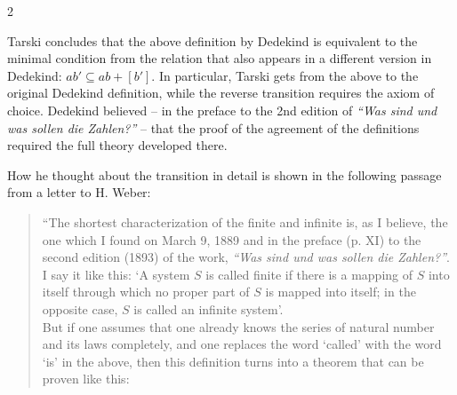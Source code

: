 \documentclass[leqno,hidelinks,10pt]{article}
\theoremstyle{definition}
\newcommand{\partof}{\subseteq}
\begin{document}
\begin{paracol}{2}
\begin{rightcolumn}
Tarski concludes that the above definition by Dedekind is equivalent to the
minimal condition from the relation that also appears in a different version in
Dedekind: $ab' \partof ab+[b']$. In particular, Tarski gets from the above to
the original Dedekind definition, while the reverse transition requires the axiom
of choice. Dedekind believed -- in the preface to the 2nd edition of
\emph{``Was sind und was sollen die Zahlen?''} -- that the proof of the agreement
of the definitions required the full theory developed there.
\


How he thought about the transition in detail is shown in the following passage
from a letter to H. Weber:

\begin{quote}
``The shortest characterization of the finite and infinite is, as I believe, the
one which I found on March 9, 1889 and in the preface (p. XI) to the second edition
(1893) of the work, \emph{``Was sind und was sollen die Zahlen?''}. I say it like
this: `A system $S$ is called finite if there is a mapping of $S$ into itself
through which no proper part of $S$ is mapped into itself; in the opposite case,
$S$ is called an infinite system'.
\ \\




\hspace{12pt} But if one assumes that one already knows the series of natural
number and its laws completely, and
one replaces the word `called' with the word `is' in the above, then this definition
turns into a theorem that can be proven like this: \\


\end{quote}
\end{rightcolumn}
\end{paracol}
\end{document}
